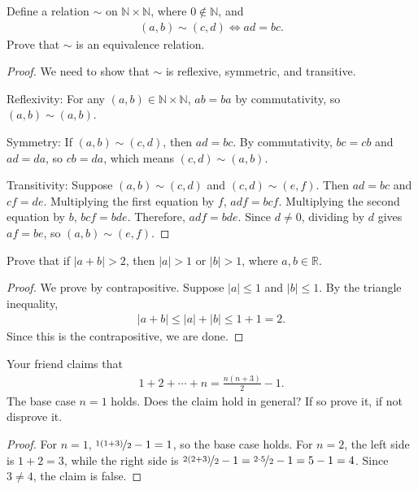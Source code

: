 \documentclass[12pt]{article}
\begin{document}
\begin{problem}
Define a relation $\sim$ on $\mathbb{N} \times \mathbb{N}$, where $0 \notin \mathbb{N}$, and
\begin{align*}
(a,b) \sim (c,d) \iff ad = bc.
\end{align*}
Prove that $\sim$ is an equivalence relation.

\begin{proof}
We need to show that $\sim$ is reflexive, symmetric, and transitive.

Reflexivity: For any $(a,b) \in \mathbb{N} \times \mathbb{N}$, $ab = ba$ by commutativity, so $(a,b) \sim (a,b)$.

Symmetry: If $(a,b) \sim (c,d)$, then $ad = bc$. By commutativity, $bc = cb$ and $ad = da$, so $cb = da$, which means $(c,d) \sim (a,b)$.

Transitivity: Suppose $(a,b) \sim (c,d)$ and $(c,d) \sim (e,f)$. Then $ad = bc$ and $cf = de$. Multiplying the first equation by $f$, $adf = bcf$. Multiplying the second equation by $b$, $bcf = bde$. Therefore, $adf = bde$. Since $d \neq 0$, dividing by $d$ gives $af = be$, so $(a,b) \sim (e,f)$.
\end{proof}
\end{problem}

\begin{problem}
Prove that if $|a + b| > 2$, then $|a| > 1$ or $|b| > 1$, where $a,b \in \mathbb{R}$. 

\begin{proof}
We prove by contrapositive. Suppose $|a| \leq 1$ and $|b| \leq 1$. By the triangle inequality,
\begin{align*}
    |a + b| \leq |a| + |b| \leq 1 + 1 = 2.
\end{align*}
Since this is the contrapositive, we are done.
\end{proof}
\end{problem}

\begin{problem}
Your friend claims that
\begin{align*}
1 + 2 + \cdots + n = \frac{n(n+3)}{2} - 1.
\end{align*}
The base case $n = 1$ holds. Does the claim hold in general? If so prove it, if not disprove it.

\begin{proof}
For $n = 1$, $\nicefrac{1(1+3)}{2} - 1 = 1$, so the base case holds. For $n = 2$, the left side is $1 + 2 = 3$, while the right side is $\nicefrac{2(2+3)}{2} - 1 = \nicefrac{2 \cdot 5}{2} - 1 = 5 - 1 = 4$. Since $3 \neq 4$, the claim is false.
\end{proof}
\end{problem}
\end{document}
